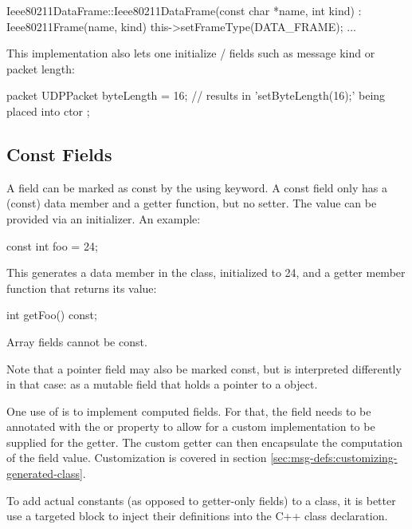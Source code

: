 \begin{cpp}
Ieee80211DataFrame::Ieee80211DataFrame(const char *name, int kind) :
    Ieee80211Frame(name, kind)
{
    this->setFrameType(DATA_FRAME);
    ...
}
\end{cpp}

This implementation also lets one initialize  /
 fields such as message kind or packet length:

\begin{msg}
packet UDPPacket
{
    byteLength = 16;  // results in 'setByteLength(16);' being placed into ctor
};
\end{msg}


\subsection{Const Fields}
\label{sec:msg-defs:const-fields}

A field can be marked as const by the using  keyword. A
const field only has a (const) data member and a getter function, but no
setter. The value can be provided via an initializer. An example:

\begin{msg}
const int foo = 24;
\end{msg}

This generates a  data member in the class, initialized to 24,
and a getter member function that returns its value:

\begin{cpp}
int getFoo() const;
\end{cpp}

Array fields cannot be const.

Note that a pointer field may also be marked const, but  is
interpreted differently in that case: as a mutable field that holds a pointer to
a  object.

One use of  is to implement computed fields. For that, the field
needs to be annotated with the  or  property
to allow for a custom implementation to be supplied for the getter. The custom
getter can then encapsulate the computation of the field value. Customization is
covered in section \ref{sec:msg-defs:customizing-generated-class}.

\begin{note}
To add actual constants (as opposed to getter-only fields) to a class, it
is better use a targeted  block to inject their definitions
into the C++ class declaration.
\end{note}


